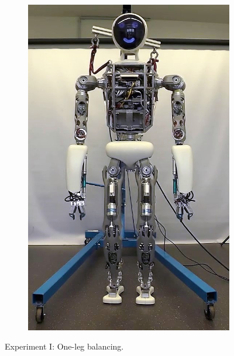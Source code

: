 \begin{figure}[h!]
\begin{subfigure}{.2\textwidth}
	\includegraphics[width=.95\linewidth]{experiments/balancing/snaps/5}
	\end{subfigure}%
\caption[Experiment I: One-leg balancing]{Experiment I: One-leg balancing.}
\label{exp:balancingSnaps}
\end{figure} 


